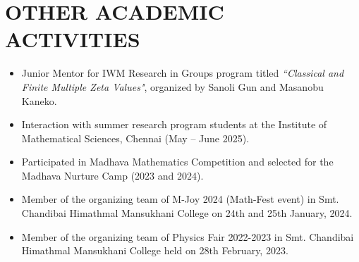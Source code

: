 \documentclass[a4paper,9pt]{extarticle}
\begin{document}
	\section*{OTHER ACADEMIC ACTIVITIES}
	\begin{itemize}
		\item Junior Mentor for IWM Research in Groups program titled \textit{``Classical and Finite Multiple Zeta Values"}, organized by Sanoli Gun and Masanobu Kaneko.
		\item Interaction with summer research program students at the Institute of Mathematical Sciences, Chennai (May -- June 2025).
		\item Participated in Madhava Mathematics Competition and selected for the Madhava Nurture Camp (2023 and 2024).
	        \item Member of the organizing team of M-Joy 2024 (Math-Fest event) in Smt. Chandibai Himathmal Mansukhani College on 24th and 25th January, 2024.
		\item Member of the organizing team of Physics Fair 2022-2023 in Smt. Chandibai Himathmal Mansukhani College held on 28th February, 2023.
	\end{itemize}
	
\end{document}
